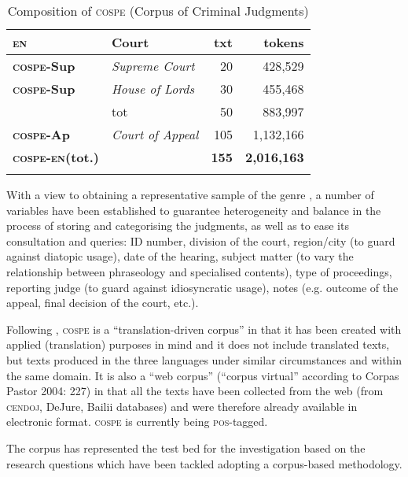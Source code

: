\documentclass[output=paper]{LSP/langsci}
\begin{document}
\begin{table}
\begin{tabular}{llrr}
       \textbf{\textsc{en}}  & \textbf{Court}       & \textbf{txt}  & \textbf{tokens} \\ \midrule
       \textbf{\textsc{cospe}-\textsc{S}up}    & \textit{Supreme Court}             & 20				& 428,529\\
       \textbf{\textsc{cospe}-\textsc{S}up}       & \textit{House of Lords}         & 30				& 455,468\\
                                & tot     & 50				& 883,997\\
       \textbf{\textsc{cospe}-\textsc{A}p}  & \textit{Court of Appeal} & 105				& 1,132,166\\ \midrule
       \textbf{\textsc{cospe}-\textsc{en}(tot.)}   &    &     \textbf{155}				& \textbf{2,016,163}\\  
\lspbottomrule
\end{tabular}
 
\caption{Composition of \textsc{cospe} (Corpus of Criminal Judgments)}
     \label{tab:6.3}
\end{table} 

With a view to obtaining a representative sample of the genre \citep[see][243]{Biber1993}, a number of variables have been established to guarantee heterogeneity and balance in the process of storing and categorising the judgments, as well as to ease its consultation and queries: ID number, division of the court, region/city (to guard against diatopic usage), date of the hearing, subject matter (to vary the relationship between phraseology and specialised contents), type of proceedings, reporting judge (to guard against idiosyncratic usage), notes (e.g. outcome of the appeal, final decision of the court, etc.).

Following \citet[105--107]{Zanettin2012}, \textsc{cospe} is a “translation-driven corpus” in that it has been created with applied (translation) purposes in mind and it does not include translated texts, but texts produced in the three languages under similar circumstances and within the same domain. It is also a “web corpus” (“corpus virtual” according to Corpas Pastor 2004: 227) in that all the texts have been collected from the web (from \textsc{cendoj}, DeJure, Bailii databases) and were therefore already available in electronic format. \textsc{cospe} is currently being \textsc{pos}-tagged.

The corpus has represented the test bed for the investigation based on the research questions which have been tackled adopting a corpus-based methodology.
\end{document}
